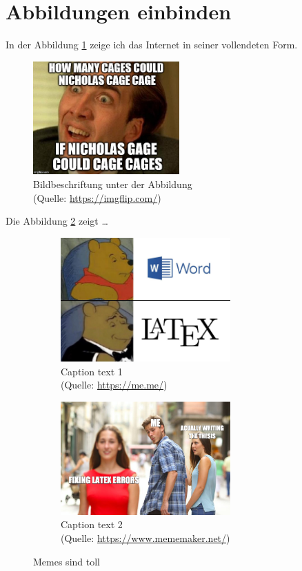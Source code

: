 \section{Abbildungen einbinden}\label{sec:abbildungen}
In der Abbildung \ref{fig:nico} zeige ich das Internet in seiner vollendeten Form.
\begin{figure}
    \includegraphics[width=0.5\textwidth,angle=0]{abb/26z3fo.jpg}
    \caption[Bildbeschriftung für Abbildungsverzeichnis]{Bildbeschriftung unter der Abbildung\\ (Quelle: \url{https://imgflip.com/})}
    \label{fig:nico}
\end{figure}
\blindtext[1]

Die Abbildung \ref{fig:latex} zeigt \dots
\begin{figure}[hb]
    \begin{subfigure}{6cm}
      \centering
      \includegraphics[width=6.5cm]{abb/1zfte27tn3q21.jpg}
      \caption{Caption text 1\\ (Quelle: \url{https://me.me/})}
    \end{subfigure}
    \begin{subfigure}{6cm}
      \centering
      \includegraphics[width=6.5cm]{abb/bucket.png}
      \caption{Caption text 2\\ (Quelle: \url{https://www.mememaker.net/})}
    \end{subfigure}
    \caption[Memes sind toll]{Memes sind toll}
    \label{fig:latex}
\end{figure}